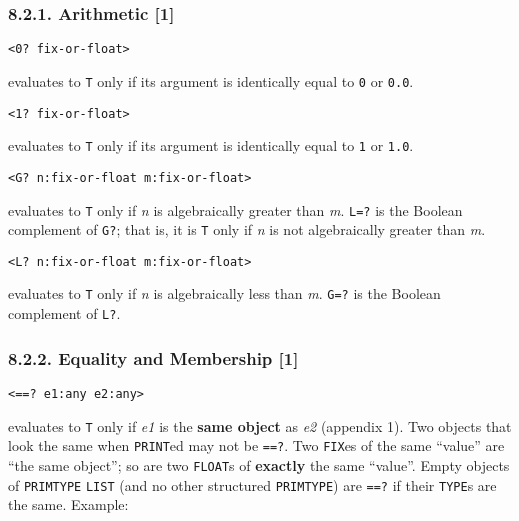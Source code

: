 \documentclass[a4paper,]{article}
\begin{document}
\subsubsection{8.2.1. Arithmetic {[}1{]}}\label{arithmetic-1}

\begin{verbatim}
<0? fix-or-float>
\end{verbatim}

 evaluates to \texttt{T} only if its argument is identically equal to \texttt{0} or \texttt{0.0}.

\begin{verbatim}
<1? fix-or-float>
\end{verbatim}

 evaluates to \texttt{T} only if its argument is identically equal to \texttt{1} or \texttt{1.0}.

\begin{verbatim}
<G? n:fix-or-float m:fix-or-float>
\end{verbatim}

 evaluates to \texttt{T} only if \emph{n} is algebraically greater than \emph{m}.
\texttt{L=?} is the Boolean complement of \texttt{G?}; that is, it is \texttt{T} only if
\emph{n} is not algebraically greater than \emph{m}.

\begin{verbatim}
<L? n:fix-or-float m:fix-or-float>
\end{verbatim}

 evaluates to \texttt{T} only if \emph{n} is algebraically less than \emph{m}.
\texttt{G=?} is the Boolean complement of \texttt{L?}.

\subsubsection{8.2.2. Equality and Membership {[}1{]}}\label{equality-and-membership-1}

\begin{verbatim}
<==? e1:any e2:any>
\end{verbatim}

 evaluates to \texttt{T} only if \emph{e1} is the \textbf{same object} as \emph{e2} (appendix
1). Two objects that look the same when \texttt{PRINT}ed may not be \texttt{==?}. Two \texttt{FIX}es of the same ``value''
are ``the same object''; so are two \texttt{FLOAT}s of \textbf{exactly} the same ``value''. Empty objects of
\texttt{PRIMTYPE} \texttt{LIST} (and no other structured \texttt{PRIMTYPE}) are \texttt{==?} if their
\texttt{TYPE}s are the same. Example:
\end{document}
